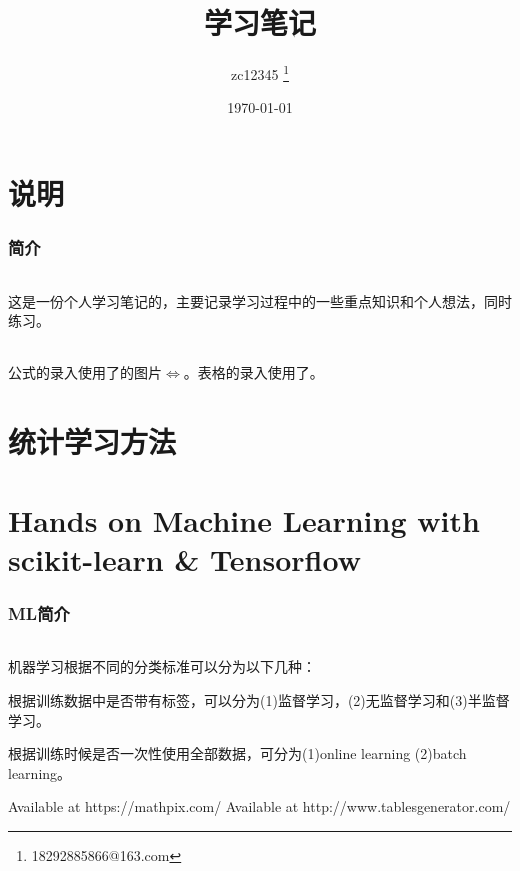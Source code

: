 \documentclass[UTF8]{ctexart}
\title{学习笔记}
\author{zc12345 \thanks{18292885866@163.com}}
\date\today
\begin{document}
\begin{titlepage}
\maketitle
\end{titlepage}

\tableofcontents

\part{说明}

\section{简介}
\paragraph{}
这是一份个人学习笔记的，主要记录学习过程中的一些重点知识和个人想法，同时练习。
\paragraph{}
公式的录入使用了\cite{mathpix}的图片$\Leftrightarrow$。表格的录入使用了\cite{tablesgenerator}。

\part{统计学习方法}



\part{Hands on Machine Learning with scikit-learn \& Tensorflow}

\section{ML简介}
\paragraph{}
机器学习根据不同的分类标准可以分为以下几种：
\subparagraph{}
根据训练数据中是否带有标签，可以分为(1)监督学习，(2)无监督学习和(3)半监督学习。
\subparagraph{}
根据训练时候是否一次性使用全部数据，可分为(1)online learning (2)batch learning。



\begin{comment}
don't show in text
\end{comment}

\renewcommand\refname{参考文献}
\begin{thebibliography}{99}
     Available at https://mathpix.com/
      Available at http://www.tablesgenerator.com/
\end{thebibliography}

\end{document}
